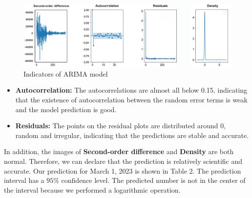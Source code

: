 \documentclass[12pt]{article}
\begin{document}
\begin{figure}[H]
    \centering
    \includegraphics[scale=0.49]{1_1results.png}
    \caption{Indicators of ARIMA model}
\end{figure}

\begin{itemize}
\setlength{\parskip}{0pt}
	\item \textbf{Autocorrelation:} The autocorrelations are almost all below 0.15, indicating that the existence of autocorrelation between the random error terms is weak and the model prediction is good.
    \item \textbf{Residuals:} The points on the residual plots are distributed around 0, random and irregular, indicating that the predictions are stable and accurate.
\end{itemize}
\vspace{-0.2cm} 

In addition, the images of \textbf{Second-order difference} and \textbf{Density} are both normal. Therefore, we can declare that the prediction is relatively scientific and accurate.
Our prediction for March 1, 2023 is shown in Table 2. The prediction interval has a $95\%$ confidence level. The predicted number is not in the center of the interval because we performed a logarithmic operation. 
\begin{table}[h]
	\begin{center}
        \caption{Conclusion of Problem 1-1}
	\end{center}
\end{table}
\end{document}
